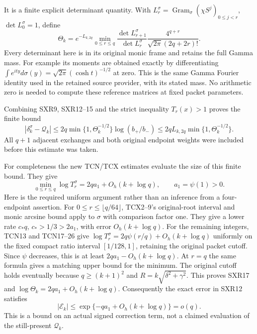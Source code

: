 It is a finite explicit determinant quantity. With
$L_r^\sigma=\operatorname{Gram}_\sigma(\chi S^j)_{0\le j<r}$,
$\det L_0^\sigma=1$, define
\begin{equation}\tag{SXR15}
 \Theta_k=e^{-L_{k,2q}}
   \min_{0\le r\le q}
   \frac{\det L_{r+1}^\sigma}{\det L_r^\sigma}
       \frac{4^{q+r}}{\sqrt{2\pi}(2q+2r)!}.
\end{equation}
Every determinant here is in its original monic frame and retains
the full Gamma mass. For example its moments are obtained exactly
by differentiating
$\int e^{ity}d\sigma(y)=\sqrt{2\pi}(\cosh t)^{-1/2}$ at zero.
This is the same Gamma Fourier identity used in the retained source
provider, with its stated mass. No arithmetic zero is needed to
compute these reference matrices at fixed packet parameters.

Combining SXR9, SXR12--15 and the strict inequality $T_r(x)>1$
proves the finite bound
\begin{equation}\tag{SXR16}
 \boxed{|\delta_k^\sigma-\mathcal Q_k|
 \le 2q\min\{1,\Theta_k^{-1/2}\}\log(b_+/b_-)
 \le 2q L_{k,2q}\min\{1,\Theta_k^{-1/2}\}.}
\end{equation}
All $q+1$ adjacent exchanges and both original endpoint weights
were included before this estimate was taken.

For completeness the new TCN/TCX estimates evaluate the size of
this finite bound. They give
\begin{equation}\tag{SXR17}
 \min_{0\le r\le q}\log T_r^\sigma
        =2q a_1+O_h(k+\log q),\qquad a_1=\psi(1)>0.
\end{equation}
Here is the required uniform argument rather than an inference
from a four-endpoint assertion. For
$0\le r\le\lfloor q/64\rfloor$, TCX2--9's original-root interval
and monic arcsine bound apply to $\sigma$ with comparison factor
one. They give a lower rate $c_*q$, $c_*>1/3>2a_1$, with
error $O_h(k+\log q)$. For the remaining integers, TCN13 and
TCN17--26 give $\log T_r^\sigma=2q\psi(r/q)+O_h(k+\log q)$
uniformly on the fixed compact ratio interval $[1/128,1]$,
retaining the original packet cutoff. Since $\psi$ decreases,
this is at least $2qa_1-O_h(k+\log q)$. At $r=q$ the same formula
gives a matching upper bound for the minimum. The original cutoff
holds eventually because $q\ge(k+1)^2$ and
$R=k\sqrt{\delta^2+\gamma^2}$. This proves SXR17 and
$\log\Theta_k=2qa_1+O_h(k+\log q)$.
Consequently the exact error in SXR12 satisfies
\begin{equation}\tag{SXR18}
 \boxed{|\mathcal E_k|
       \le\exp\{-qa_1+O_h(k+\log q)\}=o(q).}
\end{equation}
This is a bound on an actual signed correction term, not a claimed
evaluation of the still-present $\mathcal Q_k$.

